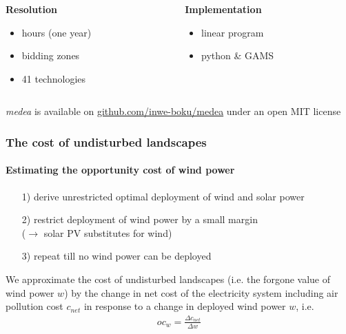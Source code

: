 \documentclass[aspectratio=1610, xcolor=dvipsnames,handout]{beamer} %
\begin{document}
\begin{frame}
\begin{footnotesize}
\begin{columns}[t]
\begin{column}{0.325\textwidth}
\textbf{Resolution}
\begin{itemize}
\item hours (one year)
\item bidding zones
\item 41 technologies
\end{itemize}
\end{column}

\begin{column}{0.325\textwidth}
\textbf{Implementation}
\begin{itemize}
\item linear program
\item python \& GAMS
\end{itemize}
\end{column}
\end{columns}
\end{footnotesize}
\bigskip

\medskip
\begin{center}
\emph{medea} is available on \href{https://github.com/inwe-boku/medea}{github.com/inwe-boku/medea} under an open MIT license
\end{center}
\end{frame}


\begin{frame}
\frametitle{The cost of undisturbed landscapes}
\framesubtitle{Estimating the opportunity cost of wind power}
\begin{itemize}
\item[1)] derive unrestricted optimal deployment of wind and solar power
\item[2)] restrict deployment of wind power by a small margin \\($\rightarrow$ solar PV substitutes for wind)
\item[3)] repeat till no wind power can be deployed
\end{itemize}

\bigskip
We approximate the cost of undisturbed landscapes (i.e. the forgone value of wind power $w$) by the change in net cost of the electricity system including air pollution cost $c_{net}$ in response to a change in deployed wind power $w$, i.e.
\begin{align*}
oc_w = \frac{\Delta c_{net}}{\Delta w}
\end{align*}

\end{frame}
\end{document}
